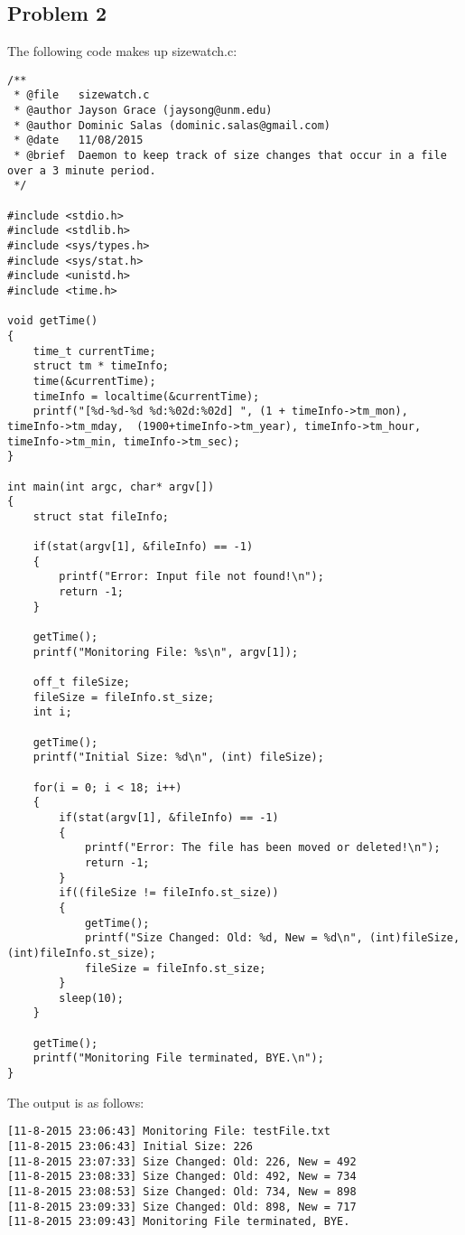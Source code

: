 \documentclass[12pt, a4paper, oneside]{article}
\begin{document}
\subsection*{Problem 2}
The following code makes up sizewatch.c: \\
\begin{lstlisting}
/**
 * @file   sizewatch.c
 * @author Jayson Grace (jaysong@unm.edu)
 * @author Dominic Salas (dominic.salas@gmail.com)
 * @date   11/08/2015
 * @brief  Daemon to keep track of size changes that occur in a file over a 3 minute period.
 */

#include <stdio.h>
#include <stdlib.h>
#include <sys/types.h>
#include <sys/stat.h>
#include <unistd.h>
#include <time.h>

void getTime()
{
    time_t currentTime;
    struct tm * timeInfo;
    time(&currentTime);
    timeInfo = localtime(&currentTime);
    printf("[%d-%d-%d %d:%02d:%02d] ", (1 + timeInfo->tm_mon), timeInfo->tm_mday,  (1900+timeInfo->tm_year), timeInfo->tm_hour, timeInfo->tm_min, timeInfo->tm_sec);
}

int main(int argc, char* argv[])
{
    struct stat fileInfo;

    if(stat(argv[1], &fileInfo) == -1)
    {
        printf("Error: Input file not found!\n");
        return -1;
    }

    getTime();
    printf("Monitoring File: %s\n", argv[1]);

    off_t fileSize;
    fileSize = fileInfo.st_size;
    int i;

    getTime();
    printf("Initial Size: %d\n", (int) fileSize);

    for(i = 0; i < 18; i++)
    {
        if(stat(argv[1], &fileInfo) == -1)
        {
            printf("Error: The file has been moved or deleted!\n");
            return -1;
        }
        if((fileSize != fileInfo.st_size))
        {
            getTime();
            printf("Size Changed: Old: %d, New = %d\n", (int)fileSize, (int)fileInfo.st_size);
            fileSize = fileInfo.st_size;
        }
        sleep(10);
    }

    getTime();
    printf("Monitoring File terminated, BYE.\n");
}
\end{lstlisting}

\pagebreak

The output is as follows: \\
\begin{lstlisting}
[11-8-2015 23:06:43] Monitoring File: testFile.txt
[11-8-2015 23:06:43] Initial Size: 226
[11-8-2015 23:07:33] Size Changed: Old: 226, New = 492
[11-8-2015 23:08:33] Size Changed: Old: 492, New = 734
[11-8-2015 23:08:53] Size Changed: Old: 734, New = 898
[11-8-2015 23:09:33] Size Changed: Old: 898, New = 717
[11-8-2015 23:09:43] Monitoring File terminated, BYE.
\end{lstlisting}
\end{document}
